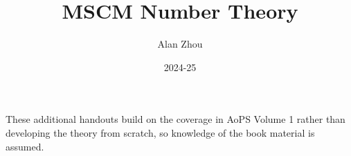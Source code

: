 \documentclass{article}
\title{MSCM Number Theory}
\author{Alan Zhou}
\date{2024-25}
\theoremstyle{definition}
\theoremstyle{remark}
\begin{document}
\maketitle

These additional handouts build on the coverage in AoPS Volume 1 rather than developing the theory from scratch, so knowledge of the book material is assumed.

\tableofcontents


\newpage
\newpage
\end{document}

